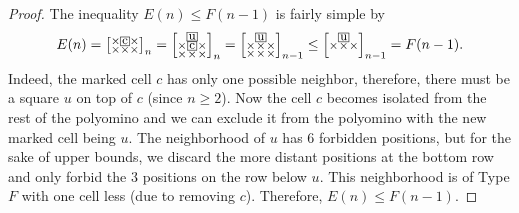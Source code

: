 \documentclass[a4paper,12pt]{article}
\makeatletter
\newcommand{\mybox}[1]{%
  \begingroup
  \setlength{\fboxsep}{1pt}%
  \fbox{\small #1}%
  \endgroup
}
\newenvironment{grid}
  {\begingroup\footnotesize
   \renewcommand{\arraystretch}{0}
   \setlength{\arraycolsep}{0pt}
   \left[\begin{array}{@{}*{10}{c}@{}}}
  {\end{array}\right]\endgroup}
\newcommand{\void}{\phantom{\times}}
\makeatother
\begin{document}
\begin{proof}
The inequality $E(n)\le F(n-1)$ is fairly simple by
\[
    E(n) = 
    \begin{grid}
        \times & \mybox{c} & \times \\
        \times & \times & \times
    \end{grid}_n
    =
    \begin{grid}
        \void & \mybox{u} & \void \\
        \times & \mybox{c} & \times \\
        \times & \times & \times
    \end{grid}_n = \begin{grid}
        \void & \mybox{u} & \void \\
        \times & \times & \times \\
        \times & \times & \times
    \end{grid}_{n-1} \le \begin{grid}
        \void & \mybox{u} & \void \\
        \times & \times & \times \\
        \void & \void & \void
    \end{grid}_{n-1} = F(n-1).
\]
Indeed, the marked cell $c$ has only one possible neighbor, therefore, there must be a square $u$ on top of $c$ (since $n\ge 2$). Now the cell $c$ becomes isolated from the rest of the polyomino and we can exclude it from the polyomino with the new marked cell being $u$. The neighborhood of $u$ has $6$ forbidden positions, but for the sake of upper bounds, we discard the more distant positions at the bottom row and only forbid the $3$ positions on the row below $u$. This neighborhood is of Type $F$ with one cell less (due to removing $c$). Therefore, $E(n)\le F(n-1)$.



\end{proof}
\end{document}

